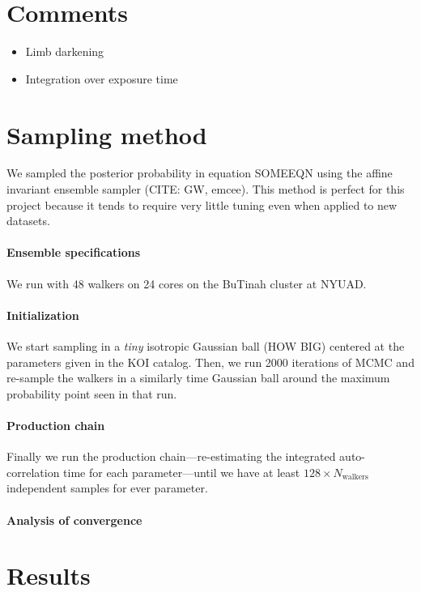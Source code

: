 \documentclass[12pt,preprint]{aastex}
\begin{document}
\section{Comments}

\begin{itemize}
\item{Limb darkening}
\item{Integration over exposure time}
\end{itemize}

\section{Sampling method}

We sampled the posterior probability in equation SOMEEQN using the affine
invariant ensemble sampler (CITE: GW, emcee).
This method is perfect for this project because it tends to require very
little tuning even when applied to new datasets.

\paragraph{Ensemble specifications}
We run with 48 walkers on 24 cores on the BuTinah cluster at NYUAD.

\paragraph{Initialization}
We start sampling in a \emph{tiny} isotropic Gaussian ball (HOW BIG) centered
at the parameters given in the KOI catalog.
Then, we run 2000 iterations of MCMC and re-sample the walkers in a similarly
time Gaussian ball around the maximum probability point seen in that run.

\paragraph{Production chain}
Finally we run the production chain---re-estimating the integrated
auto-correlation time for each parameter---until we have at least $128 \times
N_\mathrm{walkers}$ independent samples for ever parameter.

\paragraph{Analysis of convergence}


\section{Results}
\end{document}
